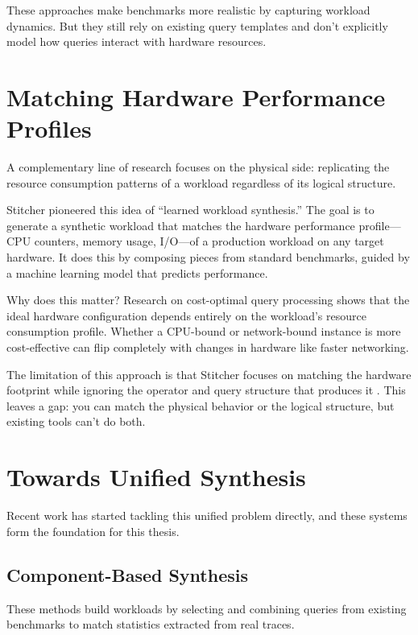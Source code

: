 \documentclass[12pt]{report}
\begin{document}
These approaches make benchmarks more realistic by capturing workload dynamics. But they still rely on existing query templates and don't explicitly model how queries interact with hardware resources.

\section{Matching Hardware Performance Profiles}
\label{sec:hardware-profiles}

A complementary line of research focuses on the physical side: replicating the resource consumption patterns of a workload regardless of its logical structure.

Stitcher \cite{stitcher} pioneered this idea of ``learned workload synthesis.'' The goal is to generate a synthetic workload that matches the hardware performance profile---CPU counters, memory usage, I/O---of a production workload on any target hardware. It does this by composing pieces from standard benchmarks, guided by a machine learning model that predicts performance.

Why does this matter? Research on cost-optimal query processing \cite{costoptimal} shows that the ideal hardware configuration depends entirely on the workload's resource consumption profile. Whether a CPU-bound or network-bound instance is more cost-effective can flip completely with changes in hardware like faster networking.

The limitation of this approach is that Stitcher focuses on matching the hardware footprint while ignoring the operator and query structure that produces it \cite{pbench, redbench}. This leaves a gap: you can match the physical behavior or the logical structure, but existing tools can't do both.

\section{Towards Unified Synthesis}
\label{sec:unified-synthesis}

Recent work has started tackling this unified problem directly, and these systems form the foundation for this thesis.

\subsection{Component-Based Synthesis}
\label{subsec:component-synthesis}

These methods build workloads by selecting and combining queries from existing benchmarks to match statistics extracted from real traces.
\end{document}
